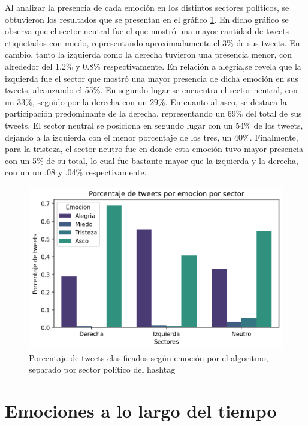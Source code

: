 Al analizar la presencia de cada emoción en los distintos sectores políticos, se obtuvieron los resultados que se presentan en el gráfico \ref{figure:porcentaje_emocion}. En dicho gráfico se observa que el sector neutral fue el que mostró una mayor cantidad de tweets etiquetados con miedo, representando aproximadamente el 3\% de sus tweets. En cambio, tanto la izquierda como la derecha tuvieron una presencia menor, con alrededor del 1.2\% y 0.8\% respectivamente. En relación a  alegría,se revela que la izquierda fue el sector que mostró una mayor presencia de dicha emoción en sus tweets, alcanzando el 55\%. En segundo lugar se encuentra el sector neutral, con un 33\%, seguido por la derecha con un 29\%. En cuanto al asco, se destaca la participación predominante de la derecha, representando un 69\% del total de sus tweets. El sector neutral se posiciona en segundo lugar con un 54\% de los tweets, dejando a la izquierda con el menor porcentaje de los tres, un 40\%. Finalmente, para la tristeza, el sector neutro fue en donde esta emoción tuvo mayor presencia con un 5\% de su total, lo cual fue bastante mayor que la izquierda y la derecha, con un un .08 y .04\% respectivamente.



\begin{figure}[t]
	\centering
	\includegraphics{Images & Logos/Results/Porcentaje de tweets por emocion por sector.png}
	\caption{Porcentaje de tweets clasificados según emoción por el algoritmo, separado por sector político del hashtag}
	\label{figure:porcentaje_emocion}
\end{figure}





\section{Emociones a lo largo del tiempo}


